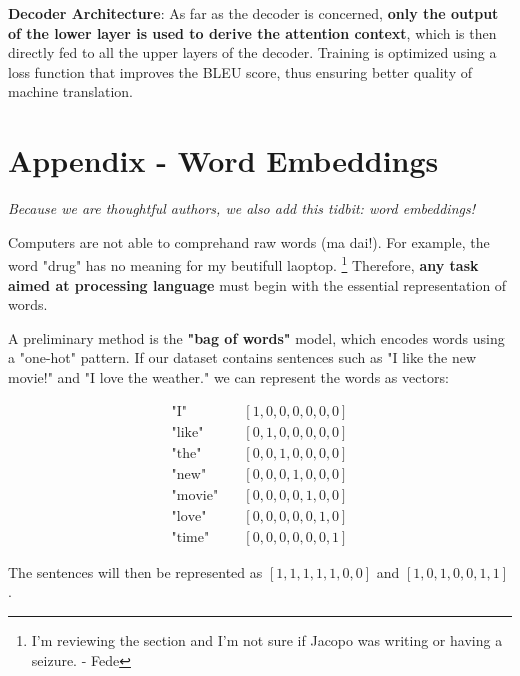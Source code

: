 \textbf{Decoder Architecture}: As far as the decoder is concerned, \textbf{only the output of the lower layer is used to derive the attention context}, which is then directly fed to all the upper layers of the decoder. Training is optimized using a loss function that improves the BLEU score, thus ensuring better quality of machine translation.


\section{Appendix - Word Embeddings}

\textit{Because we are thoughtful authors, we also add this tidbit: word embeddings!}

Computers are not able to comprehand raw words (ma dai!). For example, the word "drug" has no meaning for my beutifull laoptop. \footnote{I'm reviewing the section and I'm not sure if Jacopo was writing or having a seizure.  - Fede} Therefore, \textbf{any task aimed at processing language} must begin with the essential representation of words.

A preliminary method is the \textbf{"bag of words"} model, which encodes words using a "one-hot" pattern. If our dataset contains sentences such as "I like the new movie!" and "I love the weather." we can represent the words as vectors:

\vspace{-1cm}
\begin{minipage}[t]{0.45\textwidth}
\begin{align*}
\text{"I"} \quad &[1,0,0,0,0,0,0] \\
\text{"like"} \quad &[0,1,0,0,0,0,0] \\
\text{"the"} \quad &[0,0,1,0,0,0,0] \\
\text{"new"} \quad &[0,0,0,1,0,0,0] \\
\text{"movie"}\quad  &[0,0,0,0,1,0,0] \\
\text{"love"} \quad &[0,0,0,0,0,1,0] \\
\text{"time"} \quad &[0,0,0,0,0,0,1]
\end{align*}
\end{minipage}
\begin{minipage}[t]{0.45\textwidth}
\vspace{2cm}
\begin{center}
The sentences will then be represented as $[1,1,1,1,1,0,0]$ and $[1,0,1,0,0,1,1]$.
\end{center}
\end{minipage}
\begin{minipage}[t]{0.1\textwidth}
\end{minipage}

